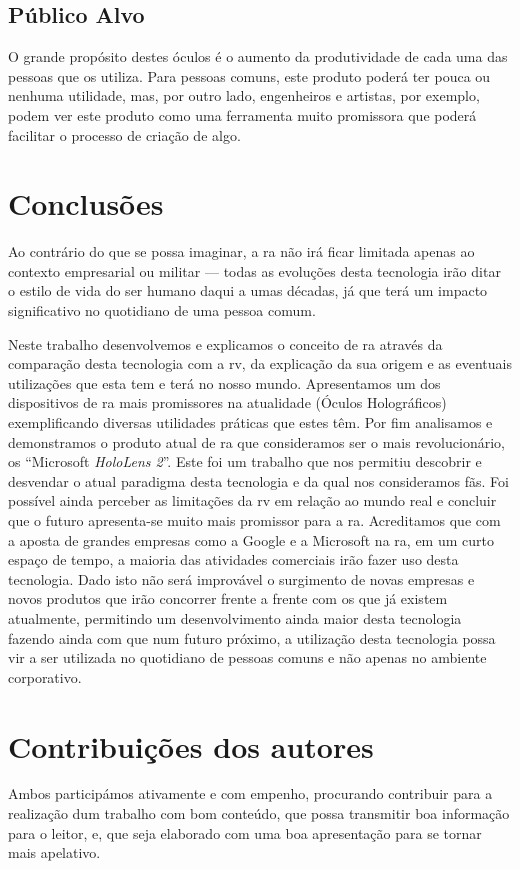 \documentclass{report}
\begin{document}
\section{Público Alvo}
O grande propósito destes óculos é o aumento da produtividade de cada uma das pessoas que os utiliza.
Para pessoas comuns, este produto poderá ter pouca ou nenhuma utilidade, mas, por outro lado, engenheiros e artistas, por exemplo, podem ver este produto como uma ferramenta muito promissora que poderá facilitar o processo de criação de algo.

\chapter{Conclusões}
\label{chap.conclusao}

Ao contrário do que se possa imaginar, a \ac{ra} não irá ficar limitada apenas ao contexto empresarial ou militar — todas as evoluções desta tecnologia irão ditar o estilo de vida do ser humano daqui a umas décadas, já que terá um impacto significativo no quotidiano de uma pessoa comum.

Neste trabalho desenvolvemos e explicamos o conceito de \ac{ra} através da comparação desta tecnologia com a \ac{rv}, da explicação da sua origem e as eventuais utilizações que esta tem e terá no nosso mundo. Apresentamos um dos dispositivos de \ac{ra} mais promissores na atualidade (Óculos Holográficos) exemplificando diversas utilidades práticas que estes têm. Por fim analisamos e demonstramos o produto atual de \ac{ra} que consideramos ser o mais revolucionário, os “Microsoft \textit{HoloLens 2}”. Este foi um trabalho que nos permitiu descobrir e desvendar o atual paradigma desta tecnologia e da qual nos consideramos fãs. Foi possível ainda perceber as limitações da \ac{rv} em relação ao mundo real e concluir que o futuro apresenta-se muito mais promissor para a \ac{ra}. Acreditamos que com a aposta de grandes empresas como a Google e a Microsoft na \ac{ra}, em um curto espaço de tempo, a maioria das atividades comerciais irão fazer uso desta tecnologia. Dado isto não será improvável o surgimento de novas empresas e novos produtos que irão concorrer frente a frente com os que já existem atualmente, permitindo um desenvolvimento ainda maior desta tecnologia fazendo ainda com que num futuro próximo, a utilização desta tecnologia possa vir a ser utilizada no quotidiano de pessoas comuns e não apenas no ambiente corporativo.

\chapter*{Contribuições dos autores}
Ambos participámos ativamente e com empenho, procurando contribuir para a realização dum trabalho com bom conteúdo, que possa transmitir boa informação para o leitor, e, que seja elaborado com uma boa apresentação para se tornar mais apelativo.
\end{document}
